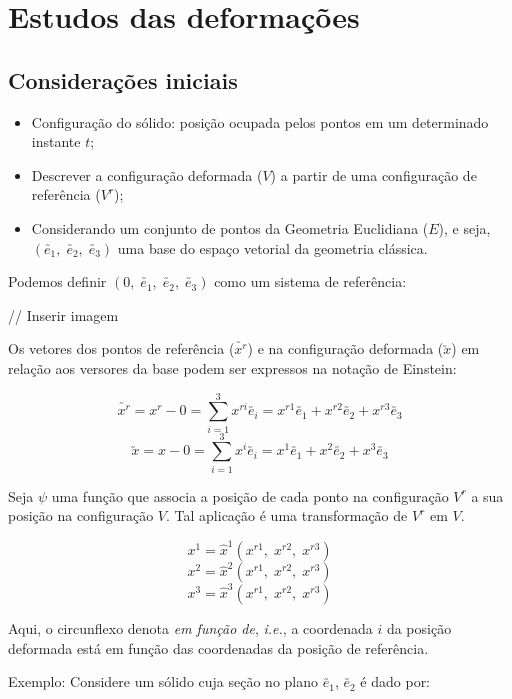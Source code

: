 \documentclass[12pt, a4paper]{article}
\begin{document}
	\section{Estudos das deformações}
	
	\subsection{Considerações iniciais}
	
	
	\begin{itemize}
		\item Configuração do sólido: posição ocupada pelos pontos em um determinado instante $t$;
		\item Descrever a configuração deformada ($V$) a partir de uma configuração de referência ($V^r$);
		\item Considerando um conjunto de pontos da Geometria Euclidiana ($E$), e seja, $(\utilde{e_1},\;\utilde{e_2},\;\utilde{e_3})$ uma base do espaço vetorial da geometria clássica.
	\end{itemize}
	
	Podemos definir $(0,\;\utilde{e_1},\;\utilde{e_2},\;\utilde{e_3})$ como um sistema de referência:
	
	// Inserir imagem
	
	Os vetores dos pontos de referência ($\utilde{x^r}$) e na configuração deformada ($\utilde{x}$) em relação aos versores da base podem ser expressos na notação de Einstein:
	
	\[\utilde{x^r}=x^r-0=\sum_{i=1}^3x^{ri}\utilde{e_i}=x^{r1}\utilde{e_1}+x^{r2}\utilde{e_2}+x^{r3}\utilde{e_3}\]
	\[\utilde{x}=x-0=\sum_{i=1}^3x^i\utilde{e_i}=x^1\utilde{e_1}+x^2\utilde{e_2}+x^3\utilde{e_3}\]
	
	Seja $\psi$ uma função que associa a posição de cada ponto na configuração $V^r$ a sua posição na configuração $V$. Tal aplicação é uma transformação de $V^r$ em $V$.
	
	\[x^1=\hat{x}^1(x^{r1},\;x^{r2},\;x^{r3})\]
	\[x^2=\hat{x}^2(x^{r1},\;x^{r2},\;x^{r3})\]
	\[x^3=\hat{x}^3(x^{r1},\;x^{r2},\;x^{r3})\]
	
	Aqui, o circunflexo denota \textit{em função de}, \textit{i.e.}, a coordenada $i$ da posição deformada está em função das coordenadas da posição de referência.
	
	Exemplo: Considere um sólido cuja seção no plano $\utilde{e_1}$, $\utilde{e_2}$ é dado por:
	
\end{document}
